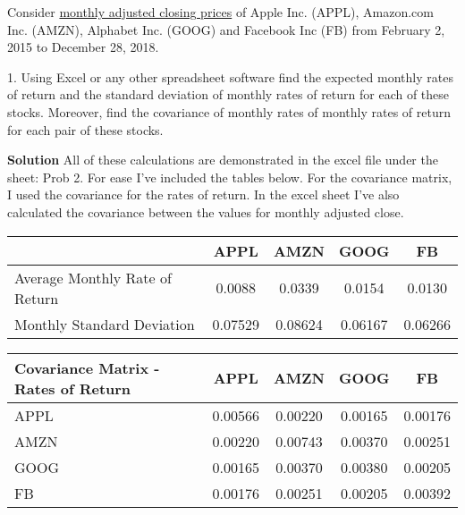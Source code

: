 \documentclass[12pt]{article}
\newenvironment{problem}[3][Problem]{\begin{trivlist}
\item[\hskip \labelsep {\bfseries #1}\hskip \labelsep {\bfseries #2.}]}{\end{trivlist}}
\begin{document}
\newpage
\begin{problem}{2 (50 Points)} \\
Consider \underline{monthly adjusted closing prices} of 
Apple Inc. (APPL), 
Amazon.com Inc. (AMZN), 
Alphabet Inc. (GOOG) and 
Facebook Inc (FB) from 
February 2, 2015 to December 28, 2018. 

1. Using Excel or any other spreadsheet software find the 
expected monthly rates of return and 
the standard deviation of monthly rates of return for each of these stocks. Moreover, find the 
covariance of monthly rates of monthly rates of return for each pair of these stocks. 

\textbf{Solution} All of these calculations are demonstrated in the excel file under the sheet: Prob 2. For ease I've included the tables below. For the covariance matrix, I used the covariance for the rates of return. In the excel sheet I've also calculated the covariance between the values for monthly adjusted close. \\
\begin{tabular}{l|cccc}
					&APPL	&AMZN	&GOOG	&FB\\
					\hline
Average Monthly Rate of Return	&0.0088	&0.0339	&0.0154	&0.0130 \\
Monthly Standard Deviation	&0.07529	&0.08624	&0.06167	&0.06266
\end{tabular}

\begin{tabular}{l|cccc}
Covariance Matrix - Rates of Return	&APPL	&AMZN	&GOOG	&FB \\
\hline
APPL	&0.00566	&0.00220	&0.00165	&0.00176 \\
AMZN	&0.00220	&0.00743	&0.00370	&0.00251 \\
GOOG	&0.00165	&0.00370	&0.00380	&0.00205 \\
FB	&0.00176	&0.00251	&0.00205	&0.00392 
\end{tabular}


\end{problem}
\end{document}
